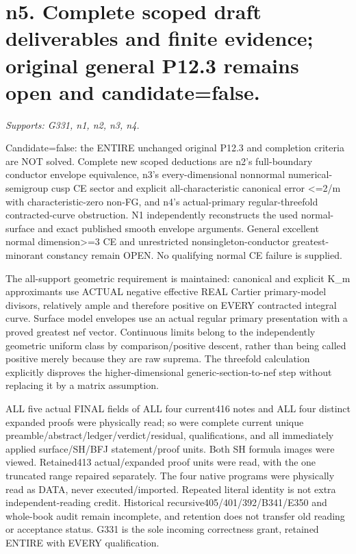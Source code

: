 \section{n5. Complete scoped draft deliverables and finite evidence; original general P12.3 remains open and candidate=false.}
\textit{Supports: G331, n1, n2, n3, n4.}

Candidate=false: the ENTIRE unchanged original P12.3 and completion criteria are NOT solved. Complete new scoped deductions are n2's full-boundary conductor envelope equivalence, n3's every-dimensional nonnormal numerical-semigroup cusp CE sector and explicit all-characteristic canonical error \textless{}=2/m with characteristic-zero non-FG, and n4's actual-primary regular-threefold contracted-curve obstruction. N1 independently reconstructs the used normal-surface and exact published smooth envelope arguments. General excellent normal dimension\textgreater{}=3 CE and unrestricted nonsingleton-conductor greatest-minorant constancy remain OPEN. No qualifying normal CE failure is supplied.

The all-support geometric requirement is maintained: canonical and explicit K\_m approximants use ACTUAL negative effective REAL Cartier primary-model divisors, relatively ample and therefore positive on EVERY contracted integral curve. Surface model envelopes use an actual regular primary presentation with a proved greatest nef vector. Continuous limits belong to the independently geometric uniform class by comparison/positive descent, rather than being called positive merely because they are raw suprema. The threefold calculation explicitly disproves the higher-dimensional generic-section-to-nef step without replacing it by a matrix assumption.

ALL five actual FINAL fields of ALL four current416 notes and ALL four distinct expanded proofs were physically read; so were complete current unique preamble/abstract/ledger/verdict/residual, qualifications, and all immediately applied surface/SH/BFJ statement/proof units. Both SH formula images were viewed. Retained413 actual/expanded proof units were read, with the one truncated range repaired separately. The four native programs were physically read as DATA, never executed/imported. Repeated literal identity is not extra independent-reading credit. Historical recursive405/401/392/B341/E350 and whole-book audit remain incomplete, and retention does not transfer old reading or acceptance status. G331 is the sole incoming correctness grant, retained ENTIRE with EVERY qualification.

